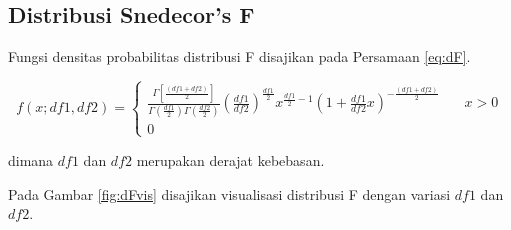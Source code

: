 \documentclass[]{book}
\begin{document}
\subsection{Distribusi Snedecor's F}\label{distribusi-snedecors-f}

Fungsi densitas probabilitas distribusi F disajikan pada Persamaan
\eqref{eq:dF}.

\begin{equation}
f\left(x;df1,df2 \right) =
  \begin{cases}
    \frac{\Gamma\left[\frac{\left(df1+df2\right)}{2}\right]}{\Gamma\left(\frac{df1}{2}\right)\Gamma\left(\frac{df2}{2}\right)}\left(\frac{df1}{df2}\right)^{\frac{df1}{2}}x^{\frac{df1}{2}-1}\left(1+\frac{df1}{df2}x\right)^{-\frac{\left(df1+df2\right)}{2}}       & \quad x>0\\
    0                   & \quad\text{}
    \end{cases}
 \label{eq:dF}
\end{equation}

dimana \(df1\) dan \(df2\) merupakan derajat kebebasan.

Pada Gambar \ref{fig:dFvis} disajikan visualisasi distribusi F dengan
variasi \(df1\) dan \(df2\).
\end{document}
